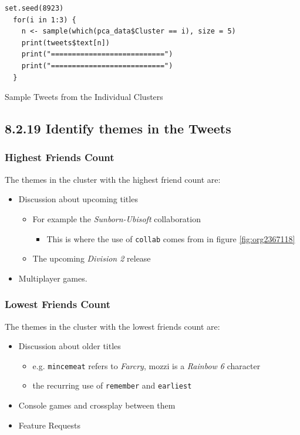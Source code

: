 \documentclass[11pt]{article}
\begin{document}
\begin{listing}[htbp]
\begin{verbatim}
set.seed(8923)
  for(i in 1:3) {
    n <- sample(which(pca_data$Cluster == i), size = 5)
    print(tweets$text[n])
    print("===========================")
    print("===========================")
  }
\end{verbatim}
\caption{\label{org85801ec}Sample Tweets from the Individual Clusters}
\end{listing}

\subsection{8.2.19 Identify themes in the Tweets}
\label{sec:org4cac855}
\subsubsection{Highest Friends Count}
\label{sec:org9ed695e}
The themes in the cluster with the highest friend count are:

\begin{itemize}
\item Discussion about upcoming titles
\begin{itemize}
\item For example the \emph{Sunborn-Ubisoft} collaboration
\begin{itemize}
\item This is where the use of \texttt{collab} comes from in figure \ref{fig:org2367118}
\end{itemize}
\item The upcoming \emph{Division 2} release
\end{itemize}
\item Multiplayer games.
\end{itemize}
\subsubsection{Lowest Friends Count}
\label{sec:orga8d6dbd}

The themes in the cluster with the lowest friends count are:

\begin{itemize}
\item Discussion about older titles
\begin{itemize}
\item e.g. \texttt{mincemeat} refers to \emph{Farcry}, mozzi is a \emph{Rainbow 6} character
\item the recurring use of \texttt{remember} and \texttt{earliest}
\end{itemize}
\item Console games and crossplay between them
\item Feature Requests
\end{itemize}
\end{document}
